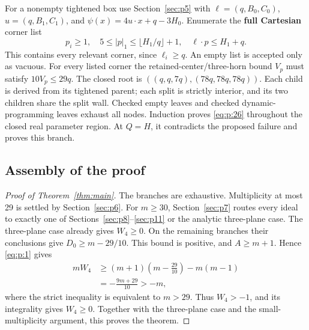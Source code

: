For a nonempty tightened box use Section~\ref{sec:p5} with
\(\ell=(q,B_0,C_0)\), \(u=(q,B_1,C_1)\), and
\(\psi(x)=4u\cdot x+q-3H_0\). Enumerate the \textbf{full Cartesian} corner list
\[
p_i\ge1,\quad5\le|p|_1\le\lfloor H_1/q\rfloor+1,\quad
\ell\cdot p\le H_1+q.
\]
This contains every relevant corner, since \(\ell_i\ge q\).
An empty list is accepted only as vacuous.
For every listed corner the retained-center/three-horn bound \(V_p\)
must satisfy \(10V_p\le29q\).
The closed root is \(((q,q,7q),(78q,78q,78q))\).
Each child is derived from its tightened parent; each split is strictly
interior, and its two children share the split wall. Checked empty leaves
and checked dynamic-programming leaves exhaust all nodes.
Induction proves \eqref{eq:p:26} throughout the closed real parameter region.
At \(Q=H\), it contradicts the proposed failure and proves this branch.

\subsection{Assembly of the proof}\label{sec:p12}

\begin{proof}[Proof of Theorem~\ref{thm:main}]

The branches are exhaustive. Multiplicity at most 29 is settled by Section~\ref{sec:p6}.
For \(m\ge30\), Section~\ref{sec:p7} routes every ideal to exactly one of Sections~\ref{sec:p8}--\ref{sec:p11} or the analytic three-plane case. The three-plane case already gives
\(W_4\ge0\). On the remaining branches their conclusions give
\(D_0\ge m-29/10\).
This bound is positive, and \(A\ge m+1\). Hence \eqref{eq:p:1} gives
\[
\begin{aligned}
mW_4
&\ge(m+1)\left(m-\frac{29}{10}\right)-m(m-1)\\
&=-\frac{9m+29}{10}>-m,
\end{aligned}
\]
where the strict inequality is equivalent to \(m>29\). Thus \(W_4>-1\),
and its integrality gives \(W_4\ge0\).
Together with the three-plane case and the small-multiplicity argument, this
proves the theorem.
\end{proof}
